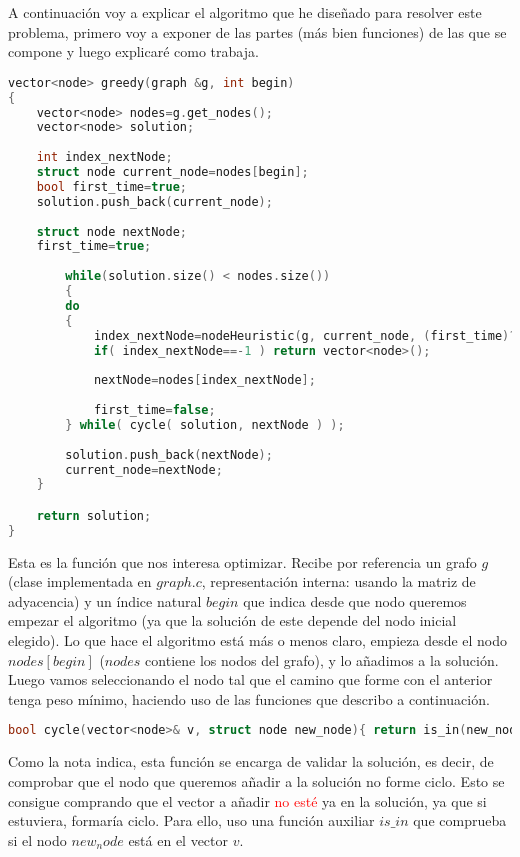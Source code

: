 \documentclass[11pt]{article}
\begin{document}
A continuación voy a explicar el algoritmo que he diseñado para resolver este problema, primero voy a exponer de las partes (más bien funciones) de las que se compone y luego explicaré como trabaja.

\begin{lstlisting}[language=C++, caption=Función obejtivo]
vector<node> greedy(graph &g, int begin)
{
	vector<node> nodes=g.get_nodes();
	vector<node> solution;
	
	int index_nextNode;
	struct node current_node=nodes[begin];
	bool first_time=true;
	solution.push_back(current_node);
	
	struct node nextNode;
	first_time=true;
	
		while(solution.size() < nodes.size())
		{
		do
		{
			index_nextNode=nodeHeuristic(g, current_node, (first_time)? 0:g.get_weight(current_node.label, nextNode.label), solution);
			if( index_nextNode==-1 ) return vector<node>();
			
			nextNode=nodes[index_nextNode];
			
			first_time=false;
		} while( cycle( solution, nextNode ) );
	
		solution.push_back(nextNode);
		current_node=nextNode;
	}

	return solution;
}
\end{lstlisting}

Esta es la función que nos interesa optimizar. Recibe por referencia un grafo $g$ (clase implementada en $graph.c$, representación interna: usando la matriz de adyacencia) y un índice natural $begin$ que indica desde que nodo queremos empezar el algoritmo (ya que la solución de este depende del nodo inicial elegido). Lo que hace el algoritmo está más o menos claro, empieza desde el nodo $nodes[begin]$ ($nodes$ contiene los nodos del grafo), y lo añadimos a la solución. Luego vamos seleccionando el nodo tal que el camino que forme con el anterior tenga peso mínimo, haciendo uso de las funciones que describo a continuación.

\begin{lstlisting}[language=C++, caption=Función para validar la solución]
bool cycle(vector<node>& v, struct node new_node){ return is_in(new_node.label, v); }
\end{lstlisting}

Como la nota indica, esta función se encarga de validar la solución, es decir, de comprobar que el nodo que queremos añadir a la solución no forme ciclo. Esto se consigue comprando que el vector a añadir \textcolor{red}{no esté} ya en la solución, ya que si estuviera, formaría ciclo. Para ello, uso una función auxiliar $is\_in$ que comprueba si el nodo $new_node$ está en el vector $v$.
\end{document}
